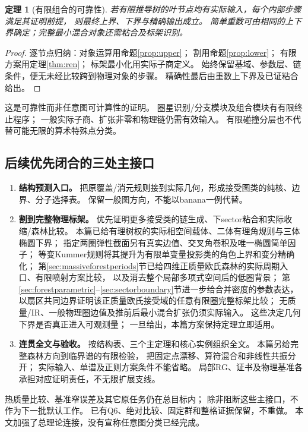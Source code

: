 \documentclass[11pt,a4paper]{ctexart}
\theoremstyle{cnplain}\newtheorem{theorem}{定理}[section]
\theoremstyle{definition}\newtheorem{definition}[theorem]{定义}
\theoremstyle{remark}\newtheorem{remark}[theorem]{注}
\begin{document}
\begin{theorem}[有限组合的可靠性]
若有限推导树的叶节点均有实际输入，每个内部步骤满足其证明前提，
则最终上界、下界与精确输出成立。
简单重数可由相同的上下界确定；完整最小混合对象还需粘合及标架识别。
\end{theorem}
\begin{proof}
逐节点归纳：对象运算用命题\ref{prop:upper}；
割用命题\ref{prop:lower}；
有限方案用定理\ref{thm:ren}；
标架最小化用实际子商定义。
始终保留基域、参数层、链条件，便无未经比较跨到物理对象的步骤。
精确性最后由重数上下界及已证粘合给出。
\end{proof}
这是可靠性而非任意图可计算性的证明。
圈星识别/分支模块及组合模块有有限终止程序；
一般实际子商、扩张非零和物理链仍需有效输入。
有限碰撞分层也不代替可能无限的算术特殊点分类。

\subsection{后续优先闭合的三处主接口}
\begin{enumerate}
\item \textbf{结构预测入口。}
把原覆盖/消元规则接到实际几何，形成接受图类的纯核、边界、分子选择表。
保留一般图方向，不能以banana一例代替。
\item \textbf{割到完整物理标架。}
优先证明更多接受类的链生成、下sector粘合和实际收缩/森林比较。
本篇已给有理树权的实际相空间载体、二体有理角规则与三体椭圆下界；
指定两圈弹性截面另有真实边值、交叉角卷积及唯一椭圆简单因子；
等变Kummer规则将其提升为有限单变量投影类的角色上界和变分精确化；
第\ref{sec:massiveforestperiods}节已给四维正质量欧氏森林的实际周期入口、有限喷射方案比较，
以及消去整个局部多项式空间后的低圈背景；
第\ref{sec:forestparametric}--\ref{sec:sectorboundary}节进一步给合并密度的参数表达，
以扇区共同边界证明该正质量欧氏接受域的任意有限圈完整标架比较；
无质量/IR、一般物理圈边值及推前后最小混合扩张仍须实际输入。
这些决定几何下界是否真正进入可观测量；
一旦给出，本篇方案保持定理立即适用。
\item \textbf{连贯全文与验收。}
按结构表、三个主定理和核心实例组织全文。
本篇另给完整森林方向到临界谱的有限检验，
把固定点漂移、算符混合和非线性共振分开；
实际输入、单谱及正则方案条件不能省略。
局部RG、证书及物理基准各承担对应证明责任，不无限扩展支线。
\end{enumerate}
热质量比较、基准窄误差及其它原任务仍在总目标内；
除非阻断这些主接口，不作为下一批默认工作。
已有Q6、绝对比较、固定群和整格证据保留，不重做。
本文加强了总理论连接，没有宣称任意图分类已经完成。
\end{document}
